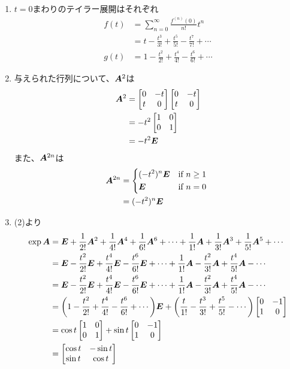\begin{ans*}
  ${}$
  \begin{enumerate}[label=(\arabic*)]
    \item $t=0$まわりのテイラー展開はそれぞれ
    \begin{align}
      f(t)
      &= \sum_{n=0}^{\infty} \frac{f^{(n)}(0)}{n!} t^n \\
      &= t - \frac{t^3}{3!} + \frac{t^5}{5!} - \frac{t^7}{7!} + \cdots \\
      g(t)
      &= 1 - \frac{t^2}{2!} + \frac{t^4}{4!} - \frac{t^6}{6!} + \cdots
    \end{align}
    \item 与えられた行列について、$\bm{A}^2$は
    \begin{align}
      \bm{A}^2
      &=
      \begin{bmatrix}
        0 & -t \\
        t & 0
      \end{bmatrix}
      \begin{bmatrix}
        0 & -t \\
        t & 0
      \end{bmatrix} \\
      &= -t^2
      \begin{bmatrix}
        1 & 0 \\
        0 & 1
      \end{bmatrix} \\
      &= -t^2 \bm{E}
    \end{align}
    また、$\bm{A}^{2n}$は
    \begin{align}
      \bA^{2n}
      &=
      \begin{dcases*}
        (-t^{2})^{n}\bE & if $n\geq 1$ \\
        \bE & if $n = 0$
      \end{dcases*} \\
      &= (-t^{2})^{n}\bE
    \end{align}
    \item (2)より
    \begin{align}
      \exp\bm{A}
      &=
      \bm{E} + \frac{1}{2!}\bm{A}^2 + \frac{1}{4!}\bm{A}^4 + \frac{1}{6!}\bm{A}^6 + \cdots
      + \frac{1}{1!}\bm{A} + \frac{1}{3!}\bm{A}^3 + \frac{1}{5!}\bm{A}^5 + \cdots \\
      &=
      \bm{E} - \frac{t^2}{2!}\bm{E} + \frac{t^4}{4!}\bm{E} - \frac{t^6}{6!}\bm{E} + \cdots
      + \frac{1}{1!}\bm{A} - \frac{t^2}{3!}\bm{A} + \frac{t^4}{5!}\bm{A} - \cdots \\
      &=
      \bm{E} - \frac{t^2}{2!}\bm{E} + \frac{t^4}{4!}\bm{E} - \frac{t^6}{6!}\bm{E} + \cdots
      + \frac{1}{1!}\bm{A} - \frac{t^2}{3!}\bm{A} + \frac{t^4}{5!}\bm{A} - \cdots \\
      &=
      \biggl(1 - \frac{t^2}{2!} + \frac{t^4}{4!} - \frac{t^6}{6!} + \cdots \biggr)\bm{E}
      + \biggl(\frac{t}{1!} - \frac{t^3}{3!} + \frac{t^5}{5!} - \cdots \biggr)
      \begin{bmatrix}
        0 & -1 \\
        1 & 0
      \end{bmatrix} \\
      &=
      \cos t
      \begin{bmatrix}
        1 & 0 \\
        0 & 1
      \end{bmatrix}
      +
      \sin t
      \begin{bmatrix}
        0 & -1 \\
        1 & 0
      \end{bmatrix} \\
      &=
      \begin{bmatrix}
        \cos t & -\sin t \\
        \sin t & \cos t
      \end{bmatrix}
    \end{align}


\end{enumerate}
\end{ans*}

